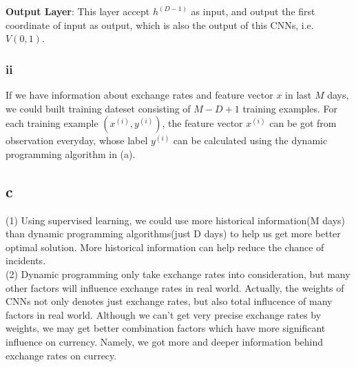 \documentclass{article}
\begin{document}
	\textbf{Output Layer}: This layer accept $h^{(D-1)}$ as input, and output the first coordinate of input as output, which is also the output of this CNNs, i.e. $V(0,1)$.

	\subsubsection{ii}
	If we have information about exchange rates and feature vector $x$ in last $M$ days, we could built training dateset consisting of $M-D+1$ training examples. For each training example $(x^{(i)},y^{(i)})$, the feature vector $x^{(i)}$ can be got from observation everyday, whose label $y^{(i)}$ can be calculated using the dynamic programming algorithm in (a).

	\subsection{c}
	(1) Using supervised learning, we could use more historical information(M days) than dynamic programming algorithms(just D days) to help us get more better optimal solution. More historical information can help reduce the chance of incidents.\\
	(2) Dynamic programming only take exchange rates into consideration, but many other factors will influence exchange rates in real world. Actually, the weights of CNNs not only denotes just exchange rates, but also total influcence of many factors in real world. Although we can't get very precise exchange rates by weights, we may get better combination factors which have more significant influence on currency. Namely, we got more and deeper information behind exchange rates on currecy.\\
\end{document}

